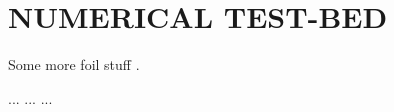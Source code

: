 \chapter{NUMERICAL TEST-BED} \label{sec:test-bed}

Some more foil stuff \cite{Abbott1959}.

...
...
...
